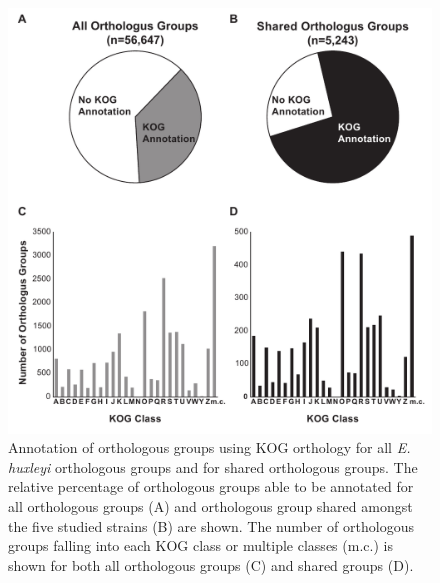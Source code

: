 \begin{figure}[p!]

  \centering
  \includegraphics[width=.75\textwidth]{Images/C6_FigureS9_KOGAnnotation.pdf}
  \caption[Annotation of orthologous groups using KOG orthology for all \textit{E. huxleyi} orthologous groups and for shared orthologous groups]{Annotation of orthologous groups using KOG orthology for all \textit{E. huxleyi} orthologous groups and for shared orthologous groups. The relative percentage of orthologous groups able to be annotated for all orthologous groups (A) and orthologous group shared amongst the five studied strains (B) are shown. The number of orthologous groups falling into each KOG class or multiple classes (m.c.) is shown for both all orthologous groups (C) and shared groups (D). }
    \label{fig:a5f9}
\end{figure}




